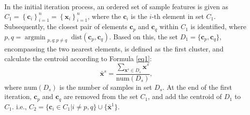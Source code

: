 \documentclass[lettersize,journal]{IEEEtran}
\begin{document}
In the initial iteration process, an ordered set of sample 
features is given as $C_1=\left\{\boldsymbol{c}_i \right\}_{i=1}^n
=\left\{\boldsymbol{x}_i \right\}_{i=1}^n$, where the 
$\boldsymbol{c}_i$ is the $i\text{-th}$ element in set 
$C_1$. Subsequently, the closest pair of elements 
$\boldsymbol{c}_p$ and $\boldsymbol{c}_q$ within $C_1$ is 
identified, where $p,q=\mathop{\text{argmin}}_{\substack{p, q; p\neq {q}}} 
\text{dist}(\boldsymbol{c}_p,\boldsymbol{c}_q)$. Based on this, 
the set $D_{1}=\{\boldsymbol{c}_p,\boldsymbol{c}_q\}$, 
encompassing the two nearest elements, is defined as the first 
cluster, and calculate the centroid according to Formula \eqref{eq1}:
\begin{equation}
\label{eq1}
\bar{\boldsymbol{x}}^s = \frac{\sum_{\boldsymbol{x}^s \in D_s} 
\boldsymbol{x}^s}{\text{num}(D_s)}, 
\end{equation}
where $\text{num}(D_s)$ is the number of samples in set $D_s$. At 
the end of the first iteration, $\boldsymbol{c}_p$ and $\boldsymbol{c}_q$ are removed from the set $C_1$, and add the 
centroid of $D_1$ to $C_1$. i.e., $C_{2}=\{\boldsymbol{c}_i \in C_{1} | i \neq 
p, q\} \cup \{\bar{\boldsymbol{x}}^1\}$.
\end{document}
